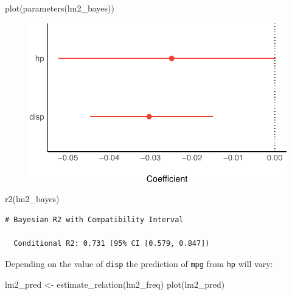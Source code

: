 \documentclass[
  letterpaper,
  DIV=11,
  numbers=noendperiod]{scrreprt}
\newenvironment{Shaded}{\begin{snugshade}}{\end{snugshade}}
\newcommand{\FunctionTok}[1]{\textcolor[rgb]{0.28,0.35,0.67}{#1}}
\newcommand{\NormalTok}[1]{\textcolor[rgb]{0.00,0.23,0.31}{#1}}
\newcommand{\OtherTok}[1]{\textcolor[rgb]{0.00,0.23,0.31}{#1}}
\theoremstyle{definition}
\theoremstyle{definition}
\theoremstyle{remark}
\begin{document}
\begin{Shaded}
\begin{Highlighting}[]
\FunctionTok{plot}\NormalTok{(}\FunctionTok{parameters}\NormalTok{(lm2\_bayes))}
\end{Highlighting}
\end{Shaded}

\begin{figure}[H]

{\centering \includegraphics{./regression1_files/figure-pdf/lm2-results-1.pdf}

}

\end{figure}

\begin{Shaded}
\begin{Highlighting}[]
\FunctionTok{r2}\NormalTok{(lm2\_bayes)}
\end{Highlighting}
\end{Shaded}

\begin{verbatim}
# Bayesian R2 with Compatibility Interval

  Conditional R2: 0.731 (95% CI [0.579, 0.847])
\end{verbatim}

Depending on the value of \texttt{disp} the prediction of \texttt{mpg}
from \texttt{hp} will vary:

\begin{Shaded}
\begin{Highlighting}[]
\NormalTok{lm2\_pred }\OtherTok{\textless{}{-}} \FunctionTok{estimate\_relation}\NormalTok{(lm2\_freq)}
\FunctionTok{plot}\NormalTok{(lm2\_pred)}
\end{Highlighting}
\end{Shaded}
\end{document}
